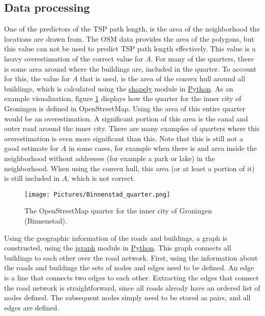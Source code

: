 \subsection{Data processing}

One of the predictors of the TSP path length, is the area of the neighborhood
the locations are drawn from. The OSM data provides the area of the polygons,
but this value can not be used to predict TSP path length effectively.
This value is a heavy overestimation of the correct value for $A$.
For many of the quarters, there is some area around where the buildings are, included in the quarter.
To account for this, the value for $A$ that is used, is the area of the convex
hull around all buildings, which is calculated using the \url{shapely}
module in \url{Python}. As an example visualization, figure \ref{fig:binnenstad_quarter} displays
how the quarter for the inner city of Groningen is defined in OpenStreetMap. Using the area of this
entire quarter would be an overestimation. A significant portion of this area is the canal and outer
road around the inner city. There are many examples of quarters where this overestimation is even
more significant than this. Note that this is still not a good estimate for $A$ in some cases,
for example when there is and area inside the neighborhood without addresses (for example a park or lake) 
in the neighborhood. When using the convex hull, this area (or at least a portion of it) is still included
in $A$, which is not correct.
\begin{figure}[H]
	\caption{The OpenStreetMap quarter for the inner city of Groningen (Binnenstad). \citep{openstreetmap}}
	\label{fig:binnenstad_quarter}
	\texttt{[image: Pictures/Binnenstad\_quarter.png]}
\end{figure}
Using the geographic information of the roads and buildings, a graph
is constructed, using the \url{igraph} module in \url{Python}. This graph
connects all buildings to each other over the road network. First, using the information about the
roads and buildings the sets of nodes and edges need to be defined. An edge is a line that connects
two edges to each other. Extracting the edges that connect the road network is straightforward,
since all roads already have an ordered list of nodes defined. The subsequent nodes simply need to
be stored as pairs, and all edges are defined.

